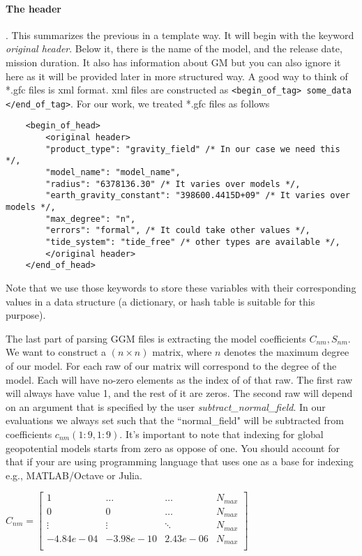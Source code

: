 	\paragraph{The header}. This summarizes the previous in a template way. It will begin with the keyword \textit{original header}. Below it, there is the name of the model, and the release date, mission duration. It also has information about GM but you can also ignore it here as it will be provided later in more structured way. A good way to think of *.gfc files is xml format. xml files are constructed as \lstinline|<begin_of_tag> some_data </end_of_tag>|. For our work, we treated *.gfc files as follows
	\begin{lstlisting}
	<begin_of_head>
		<original header>
		"product_type": "gravity_field" /* In our case we need this */,
		"model_name": "model_name",
		"radius": "6378136.30" /* It varies over models */,
		"earth_gravity_constant": "398600.4415D+09" /* It varies over models */,
		"max_degree": "n",
		"errors": "formal", /* It could take other values */,
		"tide_system": "tide_free" /* other types are available */,
		</original header>
	</end_of_head>
	\end{lstlisting}
	
	Note that we use those keywords to store these variables with their corresponding values in a data structure (a dictionary, or hash table is suitable for this purpose).
	
	The last part of parsing GGM files is extracting the model coefficients $C_{nm}, S_{nm}$. We want to construct a $(n \times n)$ matrix, where $n$ denotes the maximum degree of our model. For each raw of our matrix will correspond to the degree of the model. Each will have no-zero elements as the index of of that raw. The first raw will always have value 1, and the rest of it are zeros. The second raw will depend on an argument that is specified by the user \textit{subtract\_normal\_field}. In our evaluations we always set such that the ``normal\_field" will be subtracted from coefficients $c_{nm}(1:9,1:9)$. It's important to note that indexing for global geopotential models starts from zero as oppose of one. You should account for that if your are using programming language that uses one as a base for indexing e.g., MATLAB/Octave or Julia.
	
	\(
	C_{nm} = \begin{bmatrix}
		1 & \ldots & \ldots& N_{max}\\
		0 & 0 & \dots & N_{max}\\
		\vdots &\vdots &\ddots & N_{max}\\
		-4.84e-04 & -3.98e-10 & 2.43e-06 & N_{max}\\

	\end{bmatrix}
	\)
	
